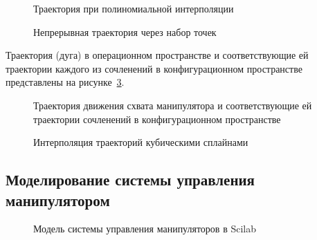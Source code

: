 \begin{figure}[h!]
	\vspace{0.2cm}
	\caption{Траектория при полиномиальной интерполяции}
	\label{img:polyn_traj}
\end{figure}

\begin{figure}[h!]
	\vspace{0.2cm}
	\caption{Непрерывная траектория через набор точек}
	\label{img:spline_traj}
\end{figure}

Траектория (дуга) в операционном пространстве и соответствующие ей траектории каждого из сочленений в конфигурационном пространстве представлены на рисунке~\ref{img:cartesian}.

\begin{figure}[h!]
	\vspace{0.2cm}
	\caption{Траектория движения схвата манипулятора и соответствующие ей траектории сочленений в конфигурационном пространстве}
	\label{img:cartesian}
\end{figure}

\begin{figure}[h!]
	\vspace{0.2cm}
	\caption{Интерполяция траекторий кубическими сплайнами}
	\label{img:js_cartesian}
\end{figure}

\clearpage

\subsection{Моделирование системы управления манипулятором}

\begin{figure}[h!]
	\caption{Модель системы управления манипуляторов в Scilab}
	\label{img:control_system}
\end{figure}

